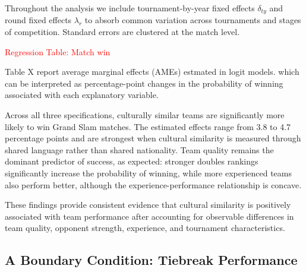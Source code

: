 \documentclass[10pt]{article}
\begin{document}
Throughout the analysis we include tournament-by-year fixed effects $\delta_{ty}$ and round fixed effects $\lambda_r$ to absorb common variation across tournaments and stages of competition. Standard errors are clustered at the match level.



\textcolor{red}{Regression Table: Match win}

Table X report average marginal effects (AMEs) estmated in logit models. which can be interpreted as percentage-point changes in the probability of winning associated with each explanatory variable. 

Across all three specifications, culturally similar teams are significantly more likely to win Grand Slam matches. The estimated effects range from 3.8 to 4.7 percentage points and are strongest when cultural similarity is measured through shared language rather than shared nationality. Team quality remains the dominant predictor of success, as expected: stronger doubles rankings significantly increase the probability of winning, while more experienced teams also perform better, although the experience-performance relationship is concave.

These findings provide consistent evidence that cultural similarity is positively associated with team performance after accounting for observable differences in team quality, opponent strength, experience, and tournament characteristics.

\subsection{A Boundary Condition: Tiebreak Performance} 


\end{document}
